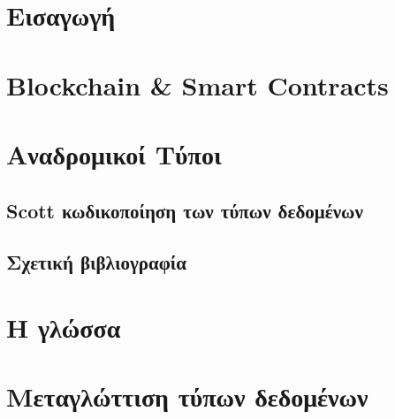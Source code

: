 \documentclass[diploma]{softlab-thesis}
\begin{document}

\tableofcontents
\listoffigures



\mainmatter




\chapter{Εισαγωγή}
\label{chap:chapter1}



\chapter{Blockchain \& Smart Contracts}
\label{chap:chapter2}



\chapter{Αναδρομικοί Τύποι}
\label{chap:chapter3}





\section{Scott κωδικοποίηση των τύπων δεδομένων}
\label{sec:data-encoding}


\section{Σχετική βιβλιογραφία}



\chapter{Η γλώσσα \FIR{}}
\label{chap:chapter4}








\chapter{Μεταγλώττιση τύπων δεδομένων}
\label{chap:chapter5}
\end{document}
